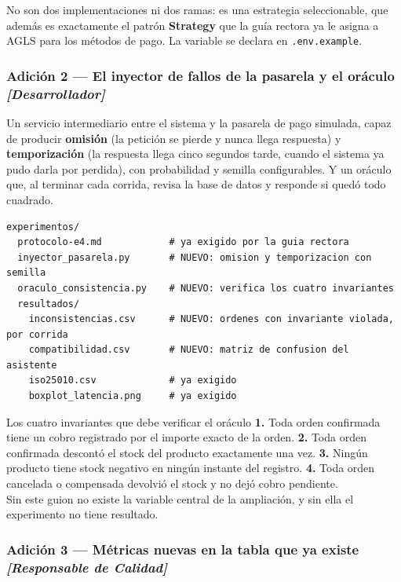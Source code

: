 \documentclass[11pt,a4paper]{article}
\begin{document}
No son dos implementaciones ni dos ramas: es una estrategia seleccionable, que además es exactamente el patrón \textbf{Strategy} que la guía rectora ya le asigna a AGLS para los métodos de pago. La variable se declara en \texttt{.env.example}.

\subsubsection{Adición 2 --- El inyector de fallos de la pasarela y el oráculo \emph{[Desarrollador]}}

Un servicio intermediario entre el sistema y la pasarela de pago simulada, capaz de producir \textbf{omisión} (la petición se pierde y nunca llega respuesta) y \textbf{temporización} (la respuesta llega cinco segundos tarde, cuando el sistema ya pudo darla por perdida), con probabilidad y semilla configurables. Y un oráculo que, al terminar cada corrida, revisa la base de datos y responde si quedó todo cuadrado.

\begin{lstlisting}
experimentos/
  protocolo-e4.md            # ya exigido por la guia rectora
  inyector_pasarela.py       # NUEVO: omision y temporizacion con semilla
  oraculo_consistencia.py    # NUEVO: verifica los cuatro invariantes
  resultados/
    inconsistencias.csv      # NUEVO: ordenes con invariante violada, por corrida
    compatibilidad.csv       # NUEVO: matriz de confusion del asistente
    iso25010.csv             # ya exigido
    boxplot_latencia.png     # ya exigido
\end{lstlisting}

\begin{defBox}{Los cuatro invariantes que debe verificar el oráculo}
	\textbf{1.} Toda orden confirmada tiene un cobro registrado por el importe exacto de la orden. \textbf{2.} Toda orden confirmada descontó el stock del producto exactamente una vez. \textbf{3.} Ningún producto tiene stock negativo en ningún instante del registro. \textbf{4.} Toda orden cancelada o compensada devolvió el stock y no dejó cobro pendiente.\\[5pt]
	Sin este guion no existe la variable central de la ampliación, y sin ella el experimento no tiene resultado.
\end{defBox}

\subsubsection{Adición 3 --- Métricas nuevas en la tabla que ya existe \emph{[Responsable de Calidad]}}
\end{document}
